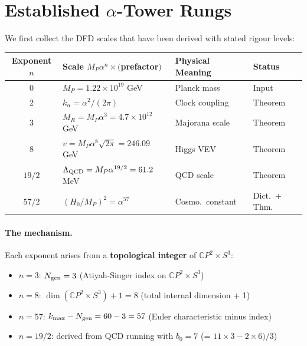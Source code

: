 \documentclass[11pt]{article}
\theoremstyle{definition}
\theoremstyle{remark}
\newcommand{\CP}{\mathbb{C}P}
\begin{document}
\section{Established $\alpha$-Tower Rungs}
\label{sec:tower}

We first collect the DFD scales that have been derived with stated rigour levels:

\begin{center}
\renewcommand{\arraystretch}{1.4}
\begin{tabular}{clll}
\toprule
\textbf{Exponent $n$} & \textbf{Scale $M_P \alpha^n \times ($prefactor$)$}
  & \textbf{Physical Meaning} & \textbf{Status} \\
\midrule
0 & $M_P = 1.22 \times 10^{19}$ GeV & Planck mass & Input \\
2 & $k_\alpha = \alpha^2/(2\pi)$ & Clock coupling & Theorem \\
3 & $M_R = M_P \alpha^3 = 4.7 \times 10^{12}$ GeV
  & Majorana scale & Theorem \\
8 & $v = M_P \alpha^8 \sqrt{2\pi} = 246.09$ GeV
  & Higgs VEV & Theorem \\
$19/2$ & $\Lambda_{\rm QCD} = M_P \alpha^{19/2} = 61.2$ MeV
  & QCD scale & Theorem \\
$57/2$ & $(H_0/M_P)^2 = \alpha^{57}$ & Cosmo.\ constant
  & Dict.\ + Thm. \\
\bottomrule
\end{tabular}
\end{center}

\paragraph{The mechanism.} Each exponent arises from a \textbf{topological integer}
of $\CP^2 \times S^3$:
\begin{itemize}
\item $n = 3$: $N_{\rm gen} = 3$ (Atiyah-Singer index on $\CP^2 \times S^3$)
\item $n = 8$: $\dim(\CP^2 \times S^3) + 1 = 8$ (total internal dimension + 1)
\item $n = 57$: $k_{\max} - N_{\rm gen} = 60 - 3 = 57$ (Euler characteristic minus index)
\item $n = 19/2$: derived from QCD running with $b_0 = 7$ (= $11 \times 3 - 2 \times 6)/3$)
\end{itemize}
\end{document}
